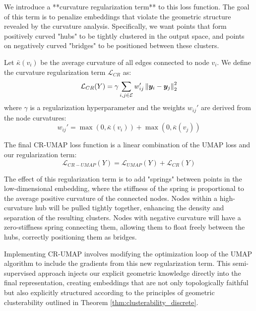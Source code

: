 We introduce a **curvature regularization term** to this loss function. The goal of this term is to penalize embeddings that violate the geometric structure revealed by the curvature analysis. Specifically, we want points that form positively curved "hubs" to be tightly clustered in the output space, and points on negatively curved "bridges" to be positioned between these clusters.

\begin{definition}
Let $\bar{\kappa}(v_i)$ be the average curvature of all edges connected to node $v_i$. We define the curvature regularization term $\mathcal{L}_{CR}$ as:
\begin{equation}
    \mathcal{L}_{CR}(Y) = \gamma \sum_{i,j \in \mathcal{E}} w_{ij}' \left\lVert\bm{y}_i - \bm{y}_j\right\rVert_2^2
\end{equation}
where $\gamma$ is a regularization hyperparameter and the weights $w_{ij}'$ are derived from the node curvatures:
\begin{equation}
    w_{ij}' = \max(0, \bar{\kappa}(v_i)) + \max(0, \bar{\kappa}(v_j))
\end{equation}
\end{definition}

The final CR-UMAP loss function is a linear combination of the UMAP loss and our regularization term:
\begin{equation}
    \mathcal{L}_{CR-UMAP}(Y) = \mathcal{L}_{UMAP}(Y) + \mathcal{L}_{CR}(Y)
\end{equation}

The effect of this regularization term is to add "springs" between points in the low-dimensional embedding, where the stiffness of the spring is proportional to the average positive curvature of the connected nodes. Nodes within a high-curvature hub will be pulled tightly together, enhancing the density and separation of the resulting clusters. Nodes with negative curvature will have a zero-stiffness spring connecting them, allowing them to float freely between the hubs, correctly positioning them as bridges.

Implementing CR-UMAP involves modifying the optimization loop of the UMAP algorithm to include the gradients from this new regularization term. This semi-supervised approach injects our explicit geometric knowledge directly into the final representation, creating embeddings that are not only topologically faithful but also explicitly structured according to the principles of geometric clusterability outlined in Theorem \ref{thm:clusterability_discrete}.